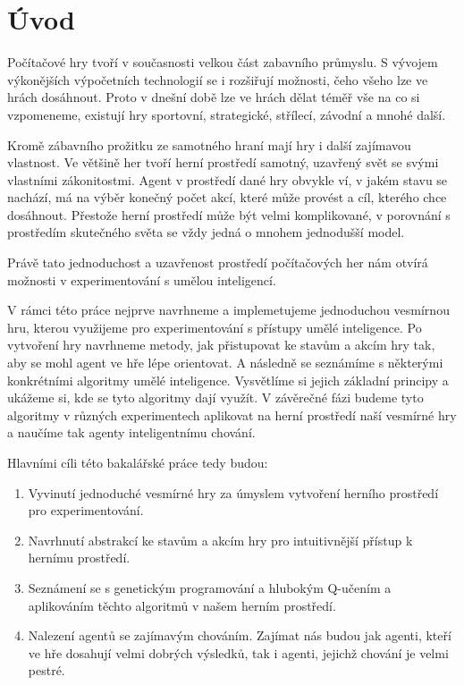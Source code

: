 \chapter*{Úvod}


Počítačové hry tvoří v současnosti velkou část zabavního průmyslu. S vývojem výkonějších výpočetních technologií se i rozšiřují možnosti, čeho všeho lze ve hrách dosáhnout.
Proto v dnešní době lze ve hrách dělat téměř vše na co si vzpomeneme, existují hry sportovní, strategické, střílecí, závodní a mnohé další.
\par
Kromě zábavního prožitku ze samotného hraní mají hry i další zajímavou vlastnost.
Ve většině her tvoří herní prostředí samotný, uzavřený svět se svými vlastními zákonitostmi.
Agent v prostředí dané hry obvykle ví, v jakém stavu se nachází, má na výběr konečný počet akcí, které může provést
a cíl, kterého chce dosáhnout.
Přestože herní prostředí může být velmi komplikované, v porovnání s prostředím skutečného světa se vždy jedná o mnohem jednodušší model.

\par
Právě tato jednoduchost a uzavřenost prostředí počítačových her nám otvírá možnosti v experimentování s umělou inteligencí.

\par
V rámci této práce nejprve navrhneme a implemetujeme jednoduchou vesmírnou hru, kterou využijeme pro experimentování s přístupy umělé inteligence.
Po vytvoření hry navrhneme metody, jak přistupovat ke stavům a akcím hry tak, aby se mohl agent ve hře lépe orientovat.
A následně se seznámíme s některými konkrétními algoritmy umělé inteligence. Vysvětlíme si jejich základní principy a ukážeme si, kde se tyto algoritmy dají využít.
V závěrečné fázi budeme tyto algoritmy v různých experimentech aplikovat na herní prostředí naší vesmírné hry a naučíme tak agenty inteligentnímu chování.

Hlavními cíli této bakalářské práce tedy budou:
\begin{enumerate}
    \item Vyvinutí jednoduché vesmírné hry za úmyslem vytvoření herního prostředí pro experimentování.
    \item Navrhnutí abstrakcí ke stavům a akcím hry pro intuitivnější přístup k hernímu prostředí.
    \item Seznámení se s genetickým programování a hlubokým Q-učením a aplikováním těchto algoritmů v našem herním prostředí.
    \item Nalezení agentů se zajímavým chováním. Zajímat nás budou jak agenti, kteří ve hře dosahují velmi dobrých výsledků, tak i agenti, jejichž chování je velmi pestré.
\end{enumerate}